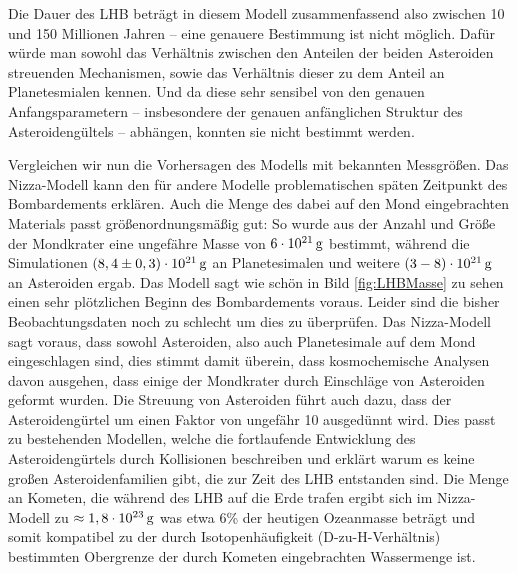 \documentclass[12pt,a4paper,twoside]{article}
\renewcommand{\cite}{\citep}
\begin{document}
Die Dauer des LHB beträgt in diesem Modell zusammenfassend also zwischen 10 und 150 Millionen Jahren – eine genauere Bestimmung ist nicht möglich. Dafür würde man sowohl das Verhältnis zwischen den Anteilen der beiden Asteroiden streuenden Mechanismen, sowie das Verhältnis dieser zu dem Anteil an Planetesmialen kennen. Und da diese sehr sensibel von den genauen Anfangsparametern – insbesondere der genauen anfänglichen Struktur des Asteroidengültels – abhängen, konnten sie nicht bestimmt werden\cite{Gomes2005}.

Vergleichen wir nun die Vorhersagen des Modells mit bekannten Messgrößen. Das Nizza-Modell kann den für andere Modelle problematischen späten Zeitpunkt des Bombardements erklären. Auch die Menge des dabei auf den Mond eingebrachten Materials passt größenordnungsmäßig gut: So wurde aus der Anzahl und Größe der Mondkrater eine ungefähre Masse von $\unit[6 \cdot 10^{21}]{g}$ bestimmt\cite{Levison2001b,Gomes2005}, während die Simulationen $\unit[\left(8,4 \pm 0,3\right) \cdot 10^{21}]{g}$ an Planetesimalen und weitere $\unit[\left( 3-8 \right) \cdot 10^{21}]{g}$ an Asteroiden ergab.
Das Modell sagt wie schön in Bild \ref{fig:LHBMasse} zu sehen einen sehr plötzlichen Beginn des Bombardements voraus. Leider sind die bisher Beobachtungsdaten noch zu schlecht um dies zu überprüfen.
Das Nizza-Modell sagt voraus, dass sowohl Asteroiden, also auch Planetesimale auf dem Mond eingeschlagen sind, dies stimmt damit überein, dass kosmochemische Analysen davon ausgehen, dass einige der Mondkrater durch Einschläge von Asteroiden geformt wurden.
Die Streuung von Asteroiden führt auch dazu, dass der Asteroidengürtel um einen Faktor von ungefähr 10 ausgedünnt wird. Dies passt zu bestehenden Modellen, welche die fortlaufende Entwicklung des Asteroidengürtels durch Kollisionen beschreiben und erklärt warum es keine großen Asteroidenfamilien gibt, die zur Zeit des LHB entstanden sind\cite{Davis1994,Bottke2005,Gomes2005}.
Die Menge an Kometen, die während des LHB auf die Erde trafen ergibt sich im Nizza-Modell zu $\approx \unit[1,8 \cdot 10^{23}]{g}$ was etwa 6\% der heutigen Ozeanmasse beträgt und somit kompatibel zu der durch Isotopenhäufigkeit (D-zu-H-Verhältnis) bestimmten Obergrenze der durch Kometen eingebrachten Wassermenge ist\cite{Morbidelli2000,Gomes2005}.
\end{document}
